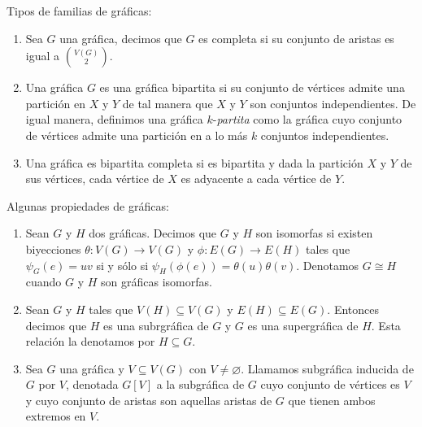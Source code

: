 \begin{definicion} Tipos de familias de gr\'aficas:
    \label{def:familias}
    \begin{enumerate}
        \item Sea $G$ una gr\'afica, decimos que $G$ es completa si su
        conjunto de aristas es igual a $\binom{V(G)}{2}$.
        \item Una gr\'afica $G$ es una gr\'afica bipartita si su conjunto de
        v\'ertices admite una partici\'on en $X$ y $Y$ de tal manera que $X$ y
        $Y$ son conjuntos independientes. De igual manera, definimos una
        gr\'afica $k$-\textit{partita} como la gr\'afica cuyo conjunto de
        v\'ertices admite una partici\'on en a lo m\'as $k$ conjuntos
        independientes.
        \item Una gr\'afica es bipartita completa si es bipartita y dada la
        partici\'on $X$ y $Y$ de sus v\'ertices, cada v\'ertice de $X$ es
        adyacente a cada v\'ertice de $Y$.   
    \end{enumerate}
\end{definicion}

\begin{definicion} Algunas propiedades de gr\'aficas:
    \label{def:propiedades}
    \begin{enumerate}
        \item Sean $G$ y $H$ dos gr\'aficas. Decimos que $G$ y $H$ son isomorfas
         si existen biyecciones $\theta: V(G) \to V(G)$ y $\phi: E(G) \to E(H)$
         tales que $\psi_G(e)=uv$ si y s\'olo si $\psi_H(\phi(e))=
         \theta(u)\theta(v)$. Denotamos $G \cong H$ cuando $G$ y $H$ son
         gr\'aficas isomorfas.
        \item Sean $G$ y $H$ tales que $V(H) \subseteq V(G)$ y $E(H) \subseteq
        E(G)$. Entonces decimos que $H$ es una subrgr\'afica de $G$ y $G$ es una
        supergr\'afica de $H$. Esta relaci\'on la denotamos por $H \subseteq G$.
        \item Sea $G$ una gr\'afica y $V \subseteq V(G)$ con $V \neq
        \varnothing$. Llamamos subgr\'afica inducida de $G$ por $V$, denotada
        $G[V]$ a la subgr\'afica de $G$ cuyo conjunto de v\'ertices es $V$ y
        cuyo conjunto de aristas son aquellas aristas de $G$ que tienen ambos
        extremos en $V$.
    \end{enumerate}
\end{definicion}

